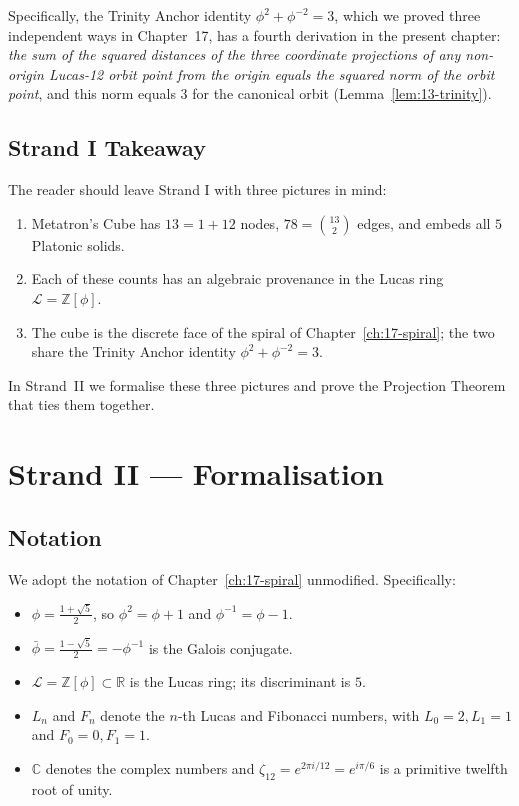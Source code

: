Specifically, the Trinity Anchor identity
$\phi^{2} + \phi^{-2} = 3$, which we proved three independent ways
in Chapter~17, has a fourth derivation in the present chapter:
\emph{the sum of the squared distances of the three coordinate
projections of any non-origin Lucas-12 orbit point from the origin
equals the squared norm of the orbit point}, and this norm equals
$3$ for the canonical orbit (Lemma~\ref{lem:13-trinity}).

\subsection{Strand I Takeaway}
\label{fa_13:sec:13-strand-I-takeaway}

The reader should leave Strand I with three pictures in mind:

\begin{enumerate}
\item Metatron's Cube has $13 = 1 + 12$ nodes, $78 = \binom{13}{2}$
  edges, and embeds all $5$ Platonic solids.
\item Each of these counts has an algebraic provenance in the
  Lucas ring $\mathcal{L} = \mathbb{Z}[\phi]$.
\item The cube is the discrete face of the spiral of
  Chapter~\ref{ch:17-spiral}; the two share the Trinity Anchor
  identity $\phi^{2} + \phi^{-2} = 3$.
\end{enumerate}

In Strand~II we formalise these three pictures and prove the
Projection Theorem that ties them together.


\section{Strand II --- Formalisation}
\label{fa_13:sec:13-strand-II}

\subsection{Notation}
\label{fa_13:sec:13-notation}

We adopt the notation of Chapter~\ref{ch:17-spiral} unmodified.
Specifically:

\begin{itemize}
\item $\phi = \frac{1+\sqrt{5}}{2}$, so $\phi^{2} = \phi + 1$ and
  $\phi^{-1} = \phi - 1$.
\item $\bar\phi = \frac{1-\sqrt{5}}{2} = -\phi^{-1}$ is the Galois
  conjugate.
\item $\mathcal{L} = \mathbb{Z}[\phi] \subset \mathbb{R}$ is the
  Lucas ring; its discriminant is $5$.
\item $L_{n}$ and $F_{n}$ denote the $n$-th Lucas and Fibonacci
  numbers, with $L_{0} = 2, L_{1} = 1$ and $F_{0} = 0, F_{1} = 1$.
\item $\mathbb{C}$ denotes the complex numbers and $\zeta_{12} =
  e^{2\pi i / 12} = e^{i\pi/6}$ is a primitive twelfth root of
  unity.
\end{itemize}

